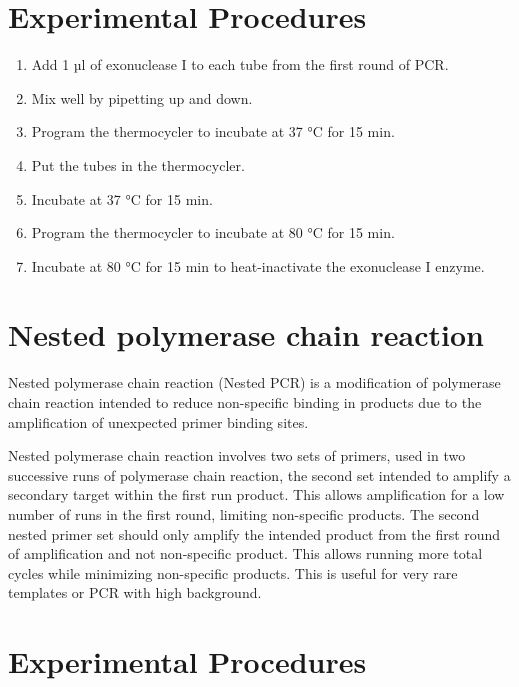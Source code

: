 \documentclass[]{book}
\providecommand{\tightlist}{%
  \setlength{\itemsep}{0pt}\setlength{\parskip}{0pt}}
\begin{document}
\hypertarget{experimental-procedures-10}{%
\section{Experimental Procedures}\label{experimental-procedures-10}}

\begin{enumerate}
\def\labelenumi{\arabic{enumi}.}
\tightlist
\item
  Add 1 µl of exonuclease I to each tube from the first round of PCR.
\item
  Mix well by pipetting up and down.
\item
  Program the thermocycler to incubate at 37 °C for 15 min.
\item
  Put the tubes in the thermocycler.
\item
  Incubate at 37 °C for 15 min.
\item
  Program the thermocycler to incubate at 80 °C for 15 min.
\item
  Incubate at 80 °C for 15 min to heat-inactivate the exonuclease I enzyme.
\end{enumerate}

\hypertarget{nested-polymerase-chain-reaction}{%
\section{Nested polymerase chain reaction}\label{nested-polymerase-chain-reaction}}

Nested polymerase chain reaction (Nested PCR) is a modification of polymerase chain reaction intended to reduce non-specific binding in products due to the amplification of unexpected primer binding sites.

Nested polymerase chain reaction involves two sets of primers, used in two successive runs of polymerase chain reaction, the second set intended to amplify a secondary target within the first run product. This allows amplification for a low number of runs in the first round, limiting non-specific products. The second nested primer set should only amplify the intended product from the first round of amplification and not non-specific product. This allows running more total cycles while minimizing non-specific products. This is useful for very rare templates or PCR with high background.

\hypertarget{experimental-procedures-11}{%
\section{Experimental Procedures}\label{experimental-procedures-11}}
\end{document}
